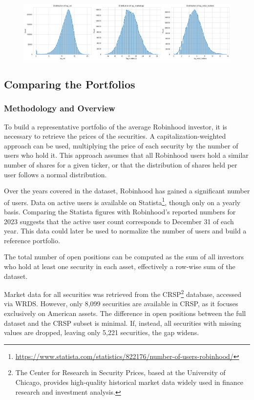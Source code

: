 \begin{figure}[h!]
    \centering
    \includegraphics[width=1\linewidth]{Images/Distributions.png}
\end{figure}












\subsection{Comparing the Portfolios}
\subsubsection{Methodology and Overview} 
To build a representative portfolio of the average Robinhood investor, it is necessary to retrieve the prices of the securities. A capitalization-weighted approach can be used, multiplying the price of each security by the number of users who hold it. This approach assumes that all Robinhood users hold a similar number of shares for a given ticker, or that the distribution of shares held per user follows a normal distribution.  

Over the years covered in the dataset, Robinhood has gained a significant number of users. Data on active users is available on Statista\footnote{\url{https://www.statista.com/statistics/822176/number-of-users-robinhood/}}, though only on a yearly basis. Comparing the Statista figures with Robinhood's reported numbers for 2023 suggests that the active user count corresponds to December 31 of each year. This data could later be used to normalize the number of users and build a reference portfolio.  

The total number of open positions can be computed as the sum of all investors who hold at least one security in each asset, effectively a row-wise sum of the dataset.  

Market data for all securities was retrieved from the CRSP\footnote{The Center for Research in Security Prices, based at the University of Chicago, provides high-quality historical market data widely used in finance research and investment analysis.} database, accessed via WRDS. However, only 8,099 securities are available in CRSP, as it focuses exclusively on American assets. The difference in open positions between the full dataset and the CRSP subset is minimal. If, instead, all securities with missing values are dropped, leaving only 5,221 securities, the gap widens.

